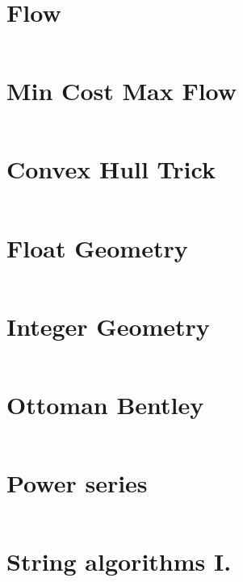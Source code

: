 \documentclass[12pt,english]{article}
\begin{document}
\section{Flow}
\inputminted[autogobble,breaklines,mathescape,linenos,numbersep=5pt,xleftmargin=0pt,fontsize=\footnotesize]{cpp}{codes/flow.tex}

\section{Min Cost Max Flow}
\inputminted[autogobble,breaklines,mathescape,linenos,numbersep=5pt,xleftmargin=0pt,fontsize=\footnotesize]{cpp}{codes/mcmf.tex}

\section{Convex Hull Trick}
\inputminted[autogobble,breaklines,mathescape,linenos,numbersep=5pt,xleftmargin=0pt,fontsize=\footnotesize]{cpp}{codes/cht.tex}

\section{Float Geometry}
\inputminted[autogobble,breaklines,mathescape,linenos,numbersep=5pt,xleftmargin=0pt,fontsize=\footnotesize]{cpp}{codes/geometry_float.tex}

\section{Integer Geometry}
\inputminted[autogobble,breaklines,mathescape,linenos,numbersep=5pt,xleftmargin=0pt,fontsize=\footnotesize]{cpp}{codes/geometry_int.tex}

\section{Ottoman Bentley}
\inputminted[autogobble,breaklines,mathescape,linenos,numbersep=5pt,xleftmargin=0pt,fontsize=\footnotesize]{cpp}{codes/ottoman_bentley.tex}

\section{Power series}
\inputminted[autogobble,breaklines,mathescape,linenos,numbersep=5pt,xleftmargin=0pt,fontsize=\footnotesize]{cpp}{codes/power_series.tex}

\section{String algorithms I.}
\inputminted[autogobble,breaklines,mathescape,linenos,numbersep=5pt,xleftmargin=0pt,fontsize=\footnotesize]{cpp}{codes/str_alg.tex}
\end{document}

